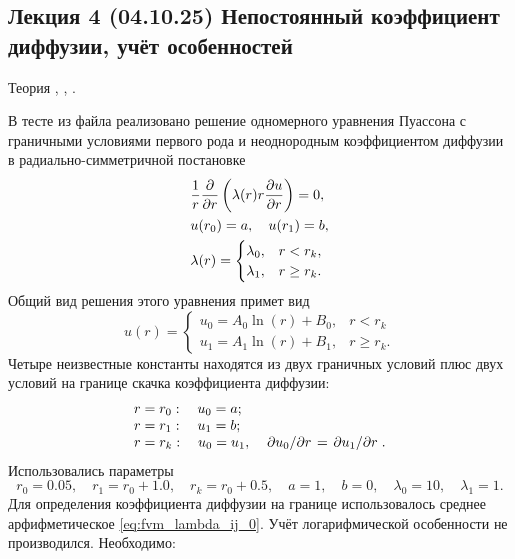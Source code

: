 \subsection{Лекция 4 (04.10.25) Непостоянный коэффициент диффузии, учёт особенностей}
Теория 
,
,
.

В тесте  из файла 
реализовано решение одномерного уравнения Пуассона с граничными условиями первого рода и неоднородным коэффициентом диффузии в радиально-симметричной постановке
\begin{align*}
&\frac1r\frac{\partial }{\partial r}\left(\lambda(r) r\frac{\partial u}{\partial r}\right) = 0, \\
&u(r_0) = a, \quad u(r_1) = b,\\
&\lambda(r) = \begin{cases}
\lambda_0, & r < r_k,\\
\lambda_1, & r \geq r_k.\\
\end{cases}
\end{align*}
Общий вид решения этого уравнения примет вид
\begin{equation*}
u(r) = 
\begin{cases}
u_{0} = A_0 \ln(r) + B_0, & r < r_k\\
u_{1} = A_1 \ln(r) + B_1, & r \geq r_k.
\end{cases}
\end{equation*}
Четыре неизвестные константы находятся из двух граничных условий плюс двух условий на границе скачка коэффициента диффузии:
\begin{equation}
\label{eq:fvm_radial_partial_lambda_conditions}
\begin{array}{l}
r = r_0: \quad u_0 = a;\\
r = r_1: \quad u_1 = b;\\
r = r_k: \quad u_0 = u_1, \quad \left.\partial u_0\middle/\partial r\right. = \left.\partial u_1\middle/\partial r\right..
\end{array}
\end{equation}
Использовались параметры
\begin{equation*}
r_0 = 0.05, \quad r_1 = r_0 + 1.0, \quad r_k = r_0 + 0.5, \quad a = 1, \quad b = 0, \quad \lambda_0 = 10, \quad \lambda_1 = 1.
\end{equation*}
Для определения коэффициента диффузии на границе использовалось среднее арфифметическое \cref{eq:fvm_lambda_ij_0}.
Учёт логарифмической особенности не производился.
Необходимо:
